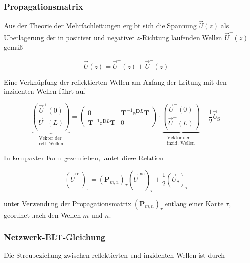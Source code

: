 \subsubsection{Propagationsmatrix}
Aus der Theorie der Mehrfachleitungen ergibt sich die Spannung $\vec{U}(z)$ als Überlagerung der in positiver und negativer $z$-Richtung laufenden Wellen $\vec{U}^{ \pm}(z)$ gemäß


\begin{equation}
	\vec{U}(z)=\vec{U}^{+}(z)+\vec{U}^{-}(z) 
\end{equation}


Eine Verknüpfung der reflektierten Wellen am Anfang der Leitung mit den inzidenten Wellen führt auf

\begin{equation}
	\underbrace{\binom{\vec{U}^{+}(0)}{\vec{U}^{-}(L)}}_{\begin{array}{c}
			\text { Vektor der }  \\
			\text { refl. Wellen }
	\end{array}}=\left(\begin{array}{cc}
		0 & \mathbf{T}^{-1} \mathrm{e}^{\mathbf{D} L} \mathbf{T} \\
		\mathbf{T}^{-1} \mathrm{e}^{\mathrm{D} L} \mathbf{T} & 0
	\end{array}\right) \cdot \underbrace{\binom{\vec{U}^{-}(0)}{\vec{U}^{+}(L)}}_{\begin{array}{c}
			\text { Vektor der } \\
			\text { inzid. Wellen }
	\end{array}}+\frac{1}{2} \vec{U}_{\mathrm{S}}
\end{equation}

In kompakter Form geschrieben, lautet diese Relation


\begin{equation}
	\left(\vec{U}^{\mathrm{ref}}\right)_{\tau}=\left(\mathbf{P}_{m, n}\right)_{\tau}\left(\vec{U}^{\mathrm{inc}}\right)_{\tau}+\frac{1}{2}\left(\vec{U}_{\mathrm{S}}\right)_{\tau} 
\end{equation}


unter Verwendung der Propagationsmatrix $\left(\mathbf{P}_{m, n}\right)_{\tau}$ entlang einer Kante $\tau$, geordnet nach den Wellen $m$ und $n$.

\subsubsection{Netzwerk-BLT-Gleichung}
Die Streubeziehung zwischen reflektierten und inzidenten Wellen ist durch


